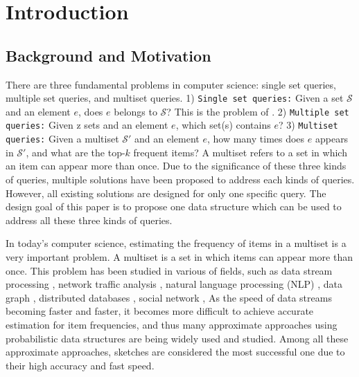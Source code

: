 \presec
\section{Introduction} \postsec

\presub
\subsection{Background and Motivation} \postsub

There are three fundamental problems in computer science: single set queries, multiple set queries, and multiset queries. 
1) \texttt{Single set queries:} Given a set $\mathcal{S}$ and an element $e$, does $e$ belongs to $\mathcal{S}$? This is the problem of . 2) \texttt{Multiple set queries:} Given z sets and an element $e$, which set(s) contains $e$? 
3) \texttt{Multiset queries:} Given a multiset $\mathcal{S'}$ and an element $e$, how many times does $e$ appears in $\mathcal{S'}$, and what are the top-$k$ frequent items? 
A multiset refers to a set in which an item can appear more than once.
Due to the significance of these three kinds of queries, multiple solutions have been proposed to address each kinds of queries.
However, all existing solutions are designed for only one specific query.
The design goal of this paper is to propose one data structure which can be used to address all these three kinds of queries. 





In today's computer science, estimating the frequency of items in a multiset is a very important problem.
A multiset is a set in which items can appear more than once.
This problem has been studied in various of fields, such as data stream processing \cite{charikar2002finding,aggarwal2010on,manerikar2009frequent,thomas2009on}, network traffic analysis \cite{liu2016one,chen2010tracking}, natural language processing (NLP) \cite{goyal2012sketch,goyal2009streaming}, data graph \cite{zhao2011gsketch:}, distributed databases \cite{cormode2005sketching}, social network \cite{aggarwal2012event}, \etc
As the speed of data streams becoming faster and faster, it becomes more difficult to achieve accurate estimation for item frequencies, and thus many approximate approaches using probabilistic data structures are being widely used and studied.
Among all these approximate approaches, sketches \cite{sketchsurvey} are considered the most successful one due to their high accuracy and fast speed.

